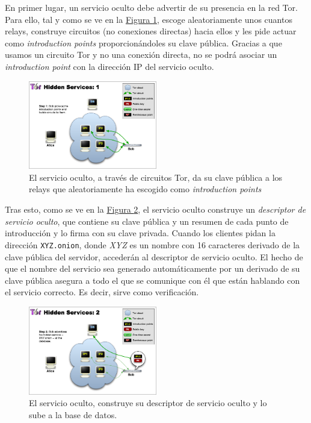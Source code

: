 \documentclass[10pt,a4paper,spanish]{article}
\begin{document}
En primer lugar, un servicio oculto debe advertir de su presencia en la red Tor. Para ello, tal y como se ve en la \hyperref[ths1]{Figura \ref*{ths1}}, escoge aleatoriamente unos cuantos relays, construye circuitos (no conexiones directas) hacia ellos y les pide actuar como \textit{introduction points} proporcionándoles su clave pública. Gracias a que usamos un circuito Tor y no una conexión directa, no se podrá asociar un \textit{introduction point} con la dirección IP del servicio oculto.

\begin{figure}[!h]
    \centering
    \includegraphics[width=0.5\textwidth]{THS-1}
    \caption{El servicio oculto, a través de circuitos Tor, da su clave pública a los relays que aleatoriamente ha escogido como \textit{introduction points}}
    \label{ths1}
\end{figure}

Tras esto, como se ve en la \hyperref[ths2]{Figura \ref*{ths2}}, el servicio oculto construye un \textit{descriptor de servicio oculto}, que contiene su clave pública y un resumen de cada punto de introducción y lo firma con su clave privada. Cuando los clientes pidan la dirección \texttt{XYZ.onion}, donde \textit{XYZ} es un nombre con 16 caracteres derivado de la clave pública del servidor, accederán al descriptor de servicio oculto. El hecho de que el nombre del servicio sea generado automáticamente por un derivado de su clave pública asegura a todo el que se comunique con él que están hablando con el servicio correcto. Es decir, sirve como verificación.

\begin{figure}[!h]
    \centering
    \includegraphics[width=0.5\textwidth]{THS-2}
    \caption{El servicio oculto, construye su descriptor de servicio oculto y lo sube a la base de datos.}
    \label{ths2}
\end{figure}
\end{document}
